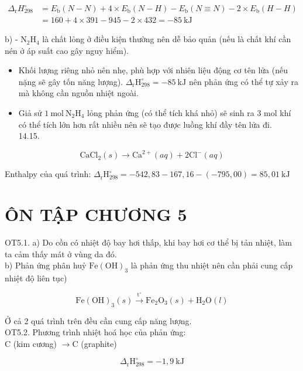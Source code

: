 \documentclass[10pt]{article}
\begin{document}
$$
\begin{aligned}
\Delta_{\mathrm{r}} H_{298}^{\circ} & =E_{\mathrm{b}}(N-N)+4 \times E_{\mathrm{b}}(N-H)-E_{\mathrm{b}}(N \equiv N)-2 \times E_{\mathrm{b}}(H-H) \\
& =160+4 \times 391-945-2 \times 432=-85 \mathrm{~kJ}
\end{aligned}
$$

b) - $\mathrm{N}_{2} \mathrm{H}_{4}$ là chất lỏng ở điều kiện thường nên dễ bảo quản (nếu là chất khí cần nén ở áp suất cao gây nguy hiểm).

\begin{itemize}
  \item Khối lượng riêng nhỏ nên nhẹ, phù hợp với nhiên liệu động cơ tên lửa (nếu nặng sẽ gây tốn năng lượng). $\Delta_{\mathrm{r}} \mathrm{H}_{298}^{\circ}=-85 \mathrm{~kJ}$ nên phản ứng có thể tự xảy ra mà không cần nguồn nhiệt ngoài.
  \item Giả sử $1 \mathrm{~mol} \mathrm{~N}_{2} \mathrm{H}_{4}$ lỏng phản ứng (có thể tích khá nhỏ) sẽ sinh ra 3 mol khí có thể tích lớn hơn rất nhiều nên sẽ tạo được luồng khí đầy tên lửa đi.\\
14.15.
\end{itemize}

$$
\mathrm{CaCl}_{2}(s) \rightarrow \mathrm{Ca}^{2+}(a q)+2 \mathrm{Cl}^{-}(a q)
$$

Enthalpy của quá trình: $\Delta_{\mathrm{r}} \mathrm{H}_{298}^{\circ}=-542,83-167,16-(-795,00)=85,01 \mathrm{~kJ}$

\section*{ÔN TẬP CHƯƠNG 5}
OT5.1. a) Do cồn có nhiệt độ bay hơi thấp, khi bay hơi cơ thể bị tản nhiệt, làm ta cảm thấy mát ở vùng da đó.\\
b) Phản ứng phân huỷ $\mathrm{Fe}(\mathrm{OH})_{3}$ là phản ứng thu nhiệt nên cần phải cung cấp nhiệt độ liên tục)

$$
\mathrm{Fe}(\mathrm{OH})_{3}(s) \xrightarrow{\mathrm{t}^{\circ}} \mathrm{Fe}_{2} \mathrm{O}_{3}(s)+\mathrm{H}_{2} \mathrm{O}(l)
$$

Ở cả 2 quá trình trên đều cần cung cấp năng lượng.\\
OT5.2. Phương trình nhiệt hoá học của phản ứng:\\
C (kim cương) $\rightarrow \mathrm{C}$ (graphite)

$$
\Delta_{\mathrm{r}} \mathrm{H}_{298}^{\circ}=-1,9 \mathrm{~kJ}
$$
\end{document}
